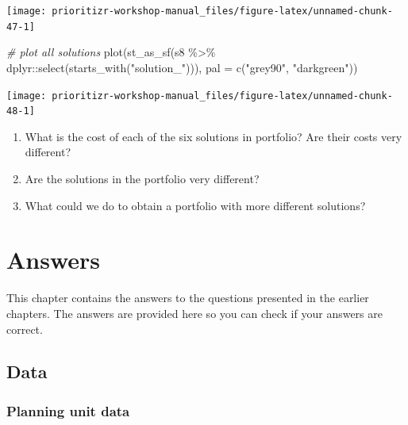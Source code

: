 \documentclass[
  12pt,
]{book}
\makeatletter
\newenvironment{Shaded}{\begin{snugshade}}{\end{snugshade}}
\newcommand{\AttributeTok}[1]{\textcolor[rgb]{0.77,0.63,0.00}{#1}}
\newcommand{\CommentTok}[1]{\textcolor[rgb]{0.56,0.35,0.01}{\textit{#1}}}
\newcommand{\FunctionTok}[1]{\textcolor[rgb]{0.00,0.00,0.00}{#1}}
\newcommand{\NormalTok}[1]{#1}
\newcommand{\SpecialCharTok}[1]{\textcolor[rgb]{0.00,0.00,0.00}{#1}}
\newcommand{\StringTok}[1]{\textcolor[rgb]{0.31,0.60,0.02}{#1}}
\providecommand{\tightlist}{%
  \setlength{\itemsep}{0pt}\setlength{\parskip}{0pt}}
\newenvironment{kframe}{%
\medskip{}
\setlength{\fboxsep}{.8em}
 \def\at@end@of@kframe{}%
 \ifinner\ifhmode%
  \def\at@end@of@kframe{\end{minipage}}%
  \begin{minipage}{\columnwidth}%
 \fi\fi%
 \def\FrameCommand##1{\hskip\@totalleftmargin \hskip-\fboxsep
 \colorbox{shadecolor}{##1}\hskip-\fboxsep
     \hskip-\linewidth \hskip-\@totalleftmargin \hskip\columnwidth}%
 \MakeFramed {\advance\hsize-\width
   \@totalleftmargin\z@ \linewidth\hsize
   \@setminipage}}%
 {\par\unskip\endMakeFramed%
 \at@end@of@kframe}
\newenvironment{rmdblock}[1]
  {
  \begin{itemize}
  \renewcommand{\labelitemi}{
    \raisebox{-.7\height}[0pt][0pt]{
      {\setkeys{Gin}{width=3em,keepaspectratio}\texttt{[image: images/\#1]}}
    }
  }
  \setlength{\fboxsep}{1em}
  \begin{kframe}
  \item
  }
  {
  \end{kframe}
  \end{itemize}
  }
\newenvironment{rmdquestion}
  {\begin{rmdblock}{question}}
  {\end{rmdblock}}
\makeatother
\begin{document}
\begin{center}\texttt{[image: prioritizr-workshop-manual\_files/figure-latex/unnamed-chunk-47-1]} \end{center}

\clearpage

\begin{Shaded}
\begin{Highlighting}[]
\CommentTok{\# plot all solutions}
\FunctionTok{plot}\NormalTok{(}\FunctionTok{st\_as\_sf}\NormalTok{(s8 }\SpecialCharTok{\%\textgreater{}\%}\NormalTok{ dplyr}\SpecialCharTok{::}\FunctionTok{select}\NormalTok{(}\FunctionTok{starts\_with}\NormalTok{(}\StringTok{"solution\_"}\NormalTok{))),}
     \AttributeTok{pal =} \FunctionTok{c}\NormalTok{(}\StringTok{"grey90"}\NormalTok{, }\StringTok{"darkgreen"}\NormalTok{))}
\end{Highlighting}
\end{Shaded}

\begin{center}\texttt{[image: prioritizr-workshop-manual\_files/figure-latex/unnamed-chunk-48-1]} \end{center}

\begin{rmdquestion}
\begin{enumerate}
\def\labelenumi{\arabic{enumi}.}
\tightlist
\item
  What is the cost of each of the six solutions in portfolio? Are their costs very different?
\item
  Are the solutions in the portfolio very different?
\item
  What could we do to obtain a portfolio with more different solutions?
\end{enumerate}
\end{rmdquestion}

\hypertarget{answers}{%
\chapter{Answers}\label{answers}}

This chapter contains the answers to the questions presented in the earlier chapters. The answers are provided here so you can check if your answers are correct.

\hypertarget{data-1}{%
\section{Data}\label{data-1}}

\hypertarget{planning-unit-data-1}{%
\subsection{Planning unit data}\label{planning-unit-data-1}}
\end{document}
